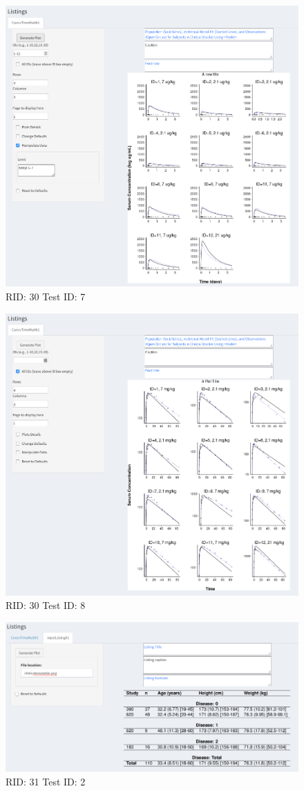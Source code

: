 \begin{figure}[H]
\includegraphics[width=.8\textwidth]{screencaps/30-7-1.png}
\caption{RID: 30 Test ID: 7}
\end{figure}
\begin{figure}[H]
\includegraphics[width=.8\textwidth]{screencaps/30-8-1.png}
\caption{RID: 30 Test ID: 8}
\end{figure}
\begin{figure}[H]
\includegraphics[width=.8\textwidth]{screencaps/31-2-1.png}
\caption{RID: 31 Test ID: 2}
\end{figure}
